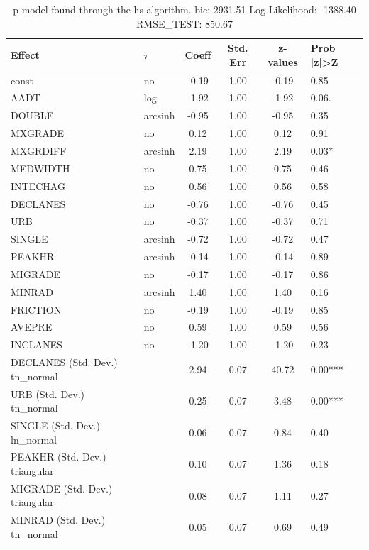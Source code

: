 \begin{table}
	\caption{p model found through the hs algorithm. bic: 2931.51 Log-Likelihood: -1388.40 RMSE_TEST: 850.67}
	\begin{center}
		\begin{tabular}{|l|l|c|c|c|l|}
			\hline
			Effect & $\tau$ & Coeff & Std. Err & z-values & Prob |z|>Z \\
			\hline
			const & no & -0.19 & 1.00 & -0.19 & 0.85 \\
			\hline
			AADT & log & -1.92 & 1.00 & -1.92 & 0.06. \\
			\hline
			DOUBLE & arcsinh & -0.95 & 1.00 & -0.95 & 0.35 \\
			\hline
			MXGRADE & no & 0.12 & 1.00 & 0.12 & 0.91 \\
			\hline
			MXGRDIFF & arcsinh & 2.19 & 1.00 & 2.19 & 0.03* \\
			\hline
			MEDWIDTH & no & 0.75 & 1.00 & 0.75 & 0.46 \\
			\hline
			INTECHAG & no & 0.56 & 1.00 & 0.56 & 0.58 \\
			\hline
			DECLANES & no & -0.76 & 1.00 & -0.76 & 0.45 \\
			\hline
			URB & no & -0.37 & 1.00 & -0.37 & 0.71 \\
			\hline
			SINGLE & arcsinh & -0.72 & 1.00 & -0.72 & 0.47 \\
			\hline
			PEAKHR & arcsinh & -0.14 & 1.00 & -0.14 & 0.89 \\
			\hline
			MIGRADE & no & -0.17 & 1.00 & -0.17 & 0.86 \\
			\hline
			MINRAD & arcsinh & 1.40 & 1.00 & 1.40 & 0.16 \\
			\hline
			FRICTION & no & -0.19 & 1.00 & -0.19 & 0.85 \\
			\hline
			AVEPRE & no & 0.59 & 1.00 & 0.59 & 0.56 \\
			\hline
			INCLANES & no & -1.20 & 1.00 & -1.20 & 0.23 \\
			\hline
			DECLANES (Std. Dev.) tn_normal &  & 2.94 & 0.07 & 40.72 & 0.00*** \\
			\hline
			URB (Std. Dev.) tn_normal &  & 0.25 & 0.07 & 3.48 & 0.00*** \\
			\hline
			SINGLE (Std. Dev.) ln_normal &  & 0.06 & 0.07 & 0.84 & 0.40 \\
			\hline
			PEAKHR (Std. Dev.) triangular &  & 0.10 & 0.07 & 1.36 & 0.18 \\
			\hline
			MIGRADE (Std. Dev.) triangular &  & 0.08 & 0.07 & 1.11 & 0.27 \\
			\hline
			MINRAD (Std. Dev.) tn_normal &  & 0.05 & 0.07 & 0.69 & 0.49 \\

\end{tabular}
\end{center}
\end{table}
